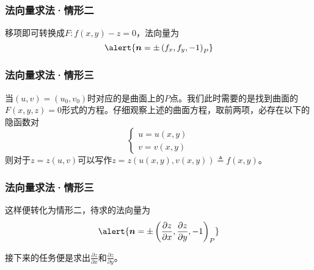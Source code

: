 \begin{frame}
    \frametitle{法向量求法·情形二}

    \begin{center}
    \end{center}\vfill\pause

    移项即可转换成$F: f(x,y)-z=0$，法向量为\pause
    \begin{equation}
        \alert{\boldsymbol{n}=\pm\left(f_x,f_y,-1\right)_P}\label{eq:norm_vec2}
    \end{equation}

\end{frame}

\begin{frame}
    \frametitle{法向量求法·情形三}

    \begin{center}
    \end{center}\vfill\pause

    当$(u,v)=(u_0,v_0)$时对应的是曲面上的$P$点。我们此时需要的是找到曲面的$F(x,y,z)=0$形式的方程。仔细观察上述的曲面方程，取前两项，必存在以下的隐函数对\pause
    \begin{equation}
        \begin{cases}
            u=u(x,y)\\
            v=v(x,y)
        \end{cases}\label{eq:hid_func_pair}
    \end{equation}\pause
    则对于$z=z(u,v)$可以写作$z=z\left(u(x,y),v(x,y)\right)\triangleq f(x,y)$。

\end{frame}

\begin{frame}
    \frametitle{法向量求法·情形三}

    这样便转化为情形二，待求的法向量为\pause
    \begin{equation}
        \alert{\boldsymbol{n}=\pm\left(\frac{\partial z}{\partial x},\frac{\partial z}{\partial y},-1\right)_P}\label{eq:norm_vec3a}
    \end{equation}\pause

    接下来的任务便是求出$\displaystyle\frac{\partial z}{\partial x}$和$\displaystyle\frac{\partial z}{\partial y}$。

\end{frame}

